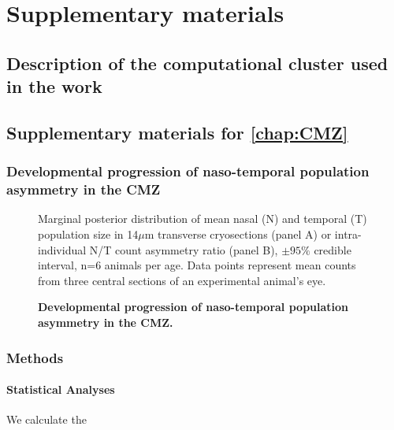 \chapter{Supplementary materials}
\section{Description of the computational cluster used in the work}
\label{cluster}


\section{Supplementary materials for \autoref{chap:CMZ}}
\subsection{Developmental progression of naso-temporal population asymmetry in the CMZ}

\begin{figure}[!h]
    \caption{{\bf Developmental progression of naso-temporal population asymmetry in the CMZ.}}
    Marginal posterior distribution of mean nasal (N) and temporal (T) population size in 14$\mu$m transverse cryosections (panel A) or intra-individual N/T count asymmetry ratio (panel B), $\pm 95\%$ credible interval, n=6 animals per age. Data points represent mean counts from three central sections of an experimental animal's eye. 
    \label{NTontology}
\end{figure}


\subsection{Methods}
\label{ssec:CMZmethods}

\subsubsection{Statistical Analyses}
We calculate the 




